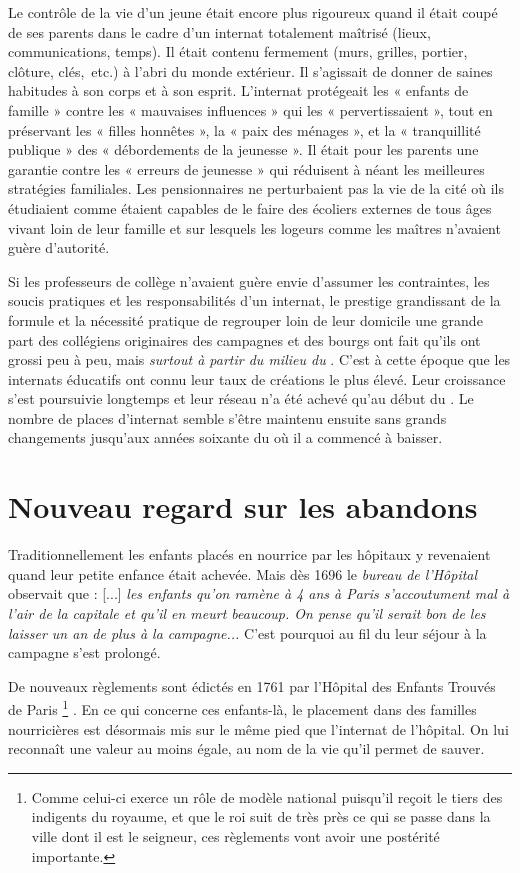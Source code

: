   Le contrôle de la vie d'un jeune était encore plus rigoureux quand il était coupé de ses parents dans le cadre d'un internat totalement maîtrisé (lieux, communications, temps). Il était contenu fermement (murs, grilles, portier, clôture, clés,~etc.) à l'abri du monde extérieur. Il s'agissait de donner de saines habitudes à son corps et à son esprit.  L'internat protégeait les « enfants de famille » contre les « mauvaises influences » qui les « pervertissaient », tout en préservant les « filles honnêtes », la « paix des ménages », et la « tranquillité publique » des « débordements de la jeunesse ». Il était pour les parents une garantie contre les « erreurs de jeunesse » qui réduisent à néant les meilleures stratégies familiales. Les pensionnaires ne perturbaient pas la vie de la cité où ils étudiaient comme étaient capables de le faire des écoliers externes de tous âges vivant loin de leur famille et sur lesquels les logeurs comme les maîtres n'avaient guère d'autorité. 
  
  Si les professeurs de collège n'avaient guère envie d'assumer les contraintes, les soucis pratiques et les responsabilités d'un internat, le prestige grandissant de la formule et la nécessité pratique de regrouper loin de leur domicile une grande part des collégiens originaires des campagnes et des bourgs  ont fait qu'ils ont grossi peu à peu, mais \emph{surtout à partir du milieu du }. C'est à cette époque que les internats éducatifs ont connu leur taux de créations le plus élevé. Leur croissance s'est poursuivie longtemps et leur réseau n'a été achevé qu'au début du . Le nombre de places d'internat semble s'être maintenu ensuite sans grands changements jusqu'aux années soixante du  où il a commencé à baisser.
  
   \section{Nouveau regard sur les abandons}


 Traditionnellement les enfants placés en nourrice par les hôpitaux y revenaient quand leur petite enfance était achevée. Mais dès 1696 le \emph{bureau de l'Hôpital} observait que : [...] \emph{les enfants qu'on ramène à 4 ans à Paris s'accoutument mal à l'air de la capitale et qu'il en meurt beaucoup. On pense qu'il serait bon de les laisser un an de plus à la campagne...} C'est pourquoi au fil du  leur séjour à la campagne s'est prolongé.

 De nouveaux règlements sont édictés en 1761 par l'Hôpital des Enfants Trouvés de Paris
\footnote{Comme celui-ci exerce un rôle de modèle national puisqu'il reçoit le tiers des indigents du royaume, et que le roi suit de très près ce qui se passe dans la ville dont il est le seigneur, ces règlements vont avoir une postérité importante.}%
. En ce qui concerne ces enfants-là, le placement dans des familles nourricières est désormais mis sur le même pied que l'internat de l'hôpital. On lui reconnaît une valeur au moins égale, au nom de la vie qu'il permet de sauver. 

